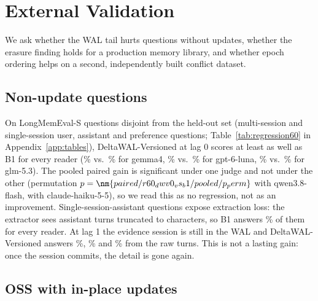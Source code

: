 \section{External Validation}
\label{sec:external}

We ask whether the WAL tail hurts questions without updates, whether the erasure finding holds for a production memory library, and whether epoch ordering helps on a second, independently built conflict dataset.

\subsection{Non-update questions}
\label{sec:regression}

On  LongMemEval-S questions disjoint from the held-out set (multi-session and single-session user, assistant and preference questions; Table~\ref{tab:regression60} in Appendix~\ref{app:tables}), DeltaWAL-Versioned at lag 0 scores at least as well as B1 for every reader (\% vs.\ \% for gemma4, \% vs.\ \% for gpt-6-luna, \% vs.\ \% for glm-5.3). The pooled paired gain is significant under one judge and not under the other (permutation $p=\nm{paired/r60_dwv0_vs_b1/pooled/p_perm}$ with qwen3.8-flash,  with claude-haiku-5-5), so we read this as no regression, not as an improvement. Single-session-assistant questions expose extraction loss: the extractor sees assistant turns truncated to  characters, so B1 answers \% of them for every reader. At lag 1 the evidence session is still in the WAL and DeltaWAL-Versioned answers \%, \% and \% from the raw turns. This is not a lasting gain: once the session commits, the detail is gone again.

\subsection{\memzero{} OSS with in-place updates}
\label{sec:mem0}


